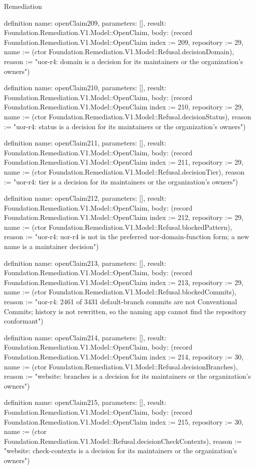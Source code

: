 \begin{lexlean}{Remediation}
\begin{semanticmodule}
definition{
  name: openClaim209,
  parameters: [],
  result: Foundation.Remediation.V1.Model::OpenClaim,
  body: (record Foundation.Remediation.V1.Model::OpenClaim {index := 209, repository := 29, name := (ctor Foundation.Remediation.V1.Model::Refusal.decisionDomain), reason := "uor-r4: domain is a decision for its maintainers or the organization's owners"})
}

definition{
  name: openClaim210,
  parameters: [],
  result: Foundation.Remediation.V1.Model::OpenClaim,
  body: (record Foundation.Remediation.V1.Model::OpenClaim {index := 210, repository := 29, name := (ctor Foundation.Remediation.V1.Model::Refusal.decisionStatus), reason := "uor-r4: status is a decision for its maintainers or the organization's owners"})
}

definition{
  name: openClaim211,
  parameters: [],
  result: Foundation.Remediation.V1.Model::OpenClaim,
  body: (record Foundation.Remediation.V1.Model::OpenClaim {index := 211, repository := 29, name := (ctor Foundation.Remediation.V1.Model::Refusal.decisionTier), reason := "uor-r4: tier is a decision for its maintainers or the organization's owners"})
}

definition{
  name: openClaim212,
  parameters: [],
  result: Foundation.Remediation.V1.Model::OpenClaim,
  body: (record Foundation.Remediation.V1.Model::OpenClaim {index := 212, repository := 29, name := (ctor Foundation.Remediation.V1.Model::Refusal.blockedPattern), reason := "uor-r4: uor-r4 is not in the preferred uor-{domain}-{function} form; a new name is a maintainer decision"})
}

definition{
  name: openClaim213,
  parameters: [],
  result: Foundation.Remediation.V1.Model::OpenClaim,
  body: (record Foundation.Remediation.V1.Model::OpenClaim {index := 213, repository := 29, name := (ctor Foundation.Remediation.V1.Model::Refusal.blockedCommits), reason := "uor-r4: 2461 of 3431 default-branch commits are not Conventional Commits; history is not rewritten, so the naming app cannot find the repository conformant"})
}

definition{
  name: openClaim214,
  parameters: [],
  result: Foundation.Remediation.V1.Model::OpenClaim,
  body: (record Foundation.Remediation.V1.Model::OpenClaim {index := 214, repository := 30, name := (ctor Foundation.Remediation.V1.Model::Refusal.decisionBranches), reason := "website: branches is a decision for its maintainers or the organization's owners"})
}

definition{
  name: openClaim215,
  parameters: [],
  result: Foundation.Remediation.V1.Model::OpenClaim,
  body: (record Foundation.Remediation.V1.Model::OpenClaim {index := 215, repository := 30, name := (ctor Foundation.Remediation.V1.Model::Refusal.decisionCheckContexts), reason := "website: check-contexts is a decision for its maintainers or the organization's owners"})
}


\end{semanticmodule}
\end{lexlean}
